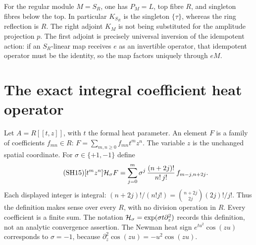 For the regular module $M=S_R$, one has $P_M=L$, top fibre $R$,
and singleton fibres below the top. In particular $K_{S_R}$
is the singleton $\{\tau\}$, whereas the ring reflection is $R$.
The right adjoint $K_M$ is not being substituted for the amplitude
projection $p$. The first adjoint is precisely universal inversion
of the idempotent action: if an $S_R$-linear map receives $e$ as
an invertible operator, that idempotent operator must be the
identity, so the map factors uniquely through $eM$.

\section{The exact integral coefficient heat operator}

Let $A=R[[t,z]]$, with $t$ the formal heat parameter. An element
$F$ is a family of coefficients $f_{mn}\in R$:
$F=\sum_{m,n\ge0}f_{mn}t^mz^n$. The variable $z$ is the
unchanged spatial coordinate. For $\sigma\in\{+1,-1\}$ define
\begin{equation}\tag{SH15}\label{sh:heat}
 [t^mz^n]\mathcal H_\sigma F
 =\sum_{j=0}^m
       \sigma^j\,\frac{(n+2j)!}{n!\,j!}\,f_{m-j,n+2j}.
\end{equation}
Each displayed integer is integral:
$(n+2j)!/(n!j!)=\binom{n+2j}{2j}(2j)!/j!$.
Thus the definition makes sense over every $R$, with no division
operation in $R$. Every coefficient is a finite sum. The notation
$\mathcal H_\sigma=\exp(\sigma t\partial_z^2)$ records this definition,
not an analytic convergence assertion. The Newman heat sign
$e^{tu^2}\cos(zu)$ corresponds to $\sigma=-1$, because
$\partial_z^2\cos(zu)=-u^2\cos(zu)$.

